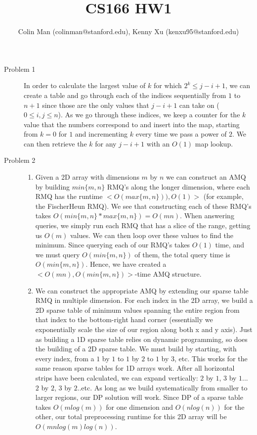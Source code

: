 \documentclass[11pt,oneside,a4paper]{article}
\begin{document}
\title{CS166 HW1}
\author{Colin Man (colinman@stanford.edu), Kenny Xu (kenxu95@stanford.edu)}

\maketitle

\begin{description}

\item[Problem 1]\noindent
In order to calculate the largest value of $k$ for which $2^k \leq j - i + 1$, we can create a table and go through each of the indices sequentially from $1$ to $n + 1$ since those are the only values that $j-i+1$ can take on ($0\leq i,j \leq n$). As we go through these indices, we keep a counter for the $k$ value that the numbers correspond to and insert into the map, starting from $k=0$ for $1$ and incrementing $k$ every time we pass a power of $2$. We can then retrieve the $k$ for any $j-i+1$ with an $O(1)$ map lookup.

\newpage

\item[Problem 2]\noindent
\begin{enumerate}[label=\roman*]
\item Given a 2D array with dimensions $m$ by $n$ we can construct an AMQ by building $min\{m, n\}$ RMQ's along the longer dimension, where each RMQ has the runtime $< O(max\{m, n\})), O(1)>$ (for example, the FischerHeun RMQ). We see that constructing each of these RMQ's takes $O(min\{m, n\} * max\{m, n\}) = O(mn)$. When answering queries, we simply run each RMQ that has a slice of the range, getting us $O(m)$ values. We can then loop over these values to find the minimum. Since querying each of our RMQ's takes $O(1)$ time, and we must query $O(min\{m, n\})$ of them, the total query time is $O(min\{m, n\})$. Hence, we have created a $<O(mn), O(min\{m, n\})>$-time AMQ structure.

\item We can construct the appropriate AMQ by extending our sparse table RMQ in multiple dimension. For each index in the 2D array, we build a 2D sparse table of minimum values spanning the entire region from that index to the bottom-right hand corner (essentially we exponentially scale the size of our region along both x and y axis). Just as building a 1D sparse table relies on dynamic programming, so does the building of a 2D sparse table. We must build by starting, with every index, from a $1$ by $1$ to $1$ by $2$ to $1$ by $3$, etc. This works for the same reason sparse tables for 1D arrays work. After all horizontal strips have been calculated, we can expand vertically: $2$ by $1$, $3$ by $1$... $2$ by $2$, $3$ by $2$..etc. As long as we build systematically from smaller to larger regions, our DP solution will work. Since DP of a sparse table takes $O(mlog(m))$ for one dimension and $O(nlog(n))$ for the other, our total preprocessing runtime for this 2D array will be $O(mnlog(m)log(n))$.\\


\end{enumerate}
\end{description}
\end{document}
